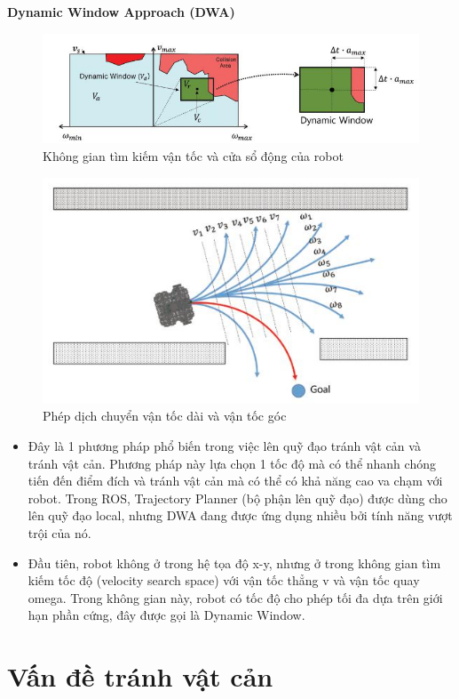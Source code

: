 \textbf{Dynamic Window Approach (DWA)}\\
\begin{figure}[tph]
	\centering
	\includegraphics[width=0.8\linewidth]{chapter2/figs/dwa}
	\caption{Không gian tìm kiếm vận tốc và cửa sổ động của robot}
	\label{fig:dwa}
\end{figure}
\begin{figure}[tph]
	\centering
	\includegraphics[width=0.7\linewidth]{chapter2/figs/dwa1}
	\caption{Phép dịch chuyển vận tốc dài và vận tốc góc}
	\label{fig:dwa1}
\end{figure}

\begin{itemize}
	\item Đây là  1 phương pháp phổ biến trong việc lên quỹ đạo tránh vật cản và tránh vật cản. Phương pháp này lựa chọn 1 tốc độ mà có thể nhanh chóng tiến đến điểm đích và tránh vật cản mà có thể có khả năng cao va chạm với robot. Trong ROS, Trajectory Planner (bộ phận lên quỹ đạo) được dùng cho lên quỹ đạo local, nhưng DWA đang được ứng dụng nhiều bởi tính năng vượt trội của nó. 
	\item Đầu tiên, robot không ở trong hệ tọa độ x-y, nhưng ở trong không gian tìm kiếm tốc độ (velocity search space) với vận tốc thẳng v và vận tốc quay omega. Trong không gian này, robot có tốc độ cho phép tối đa dựa trên giới hạn phần cứng, đây được gọi là Dynamic Window.
\end{itemize}

\section{Vấn đề tránh vật cản}